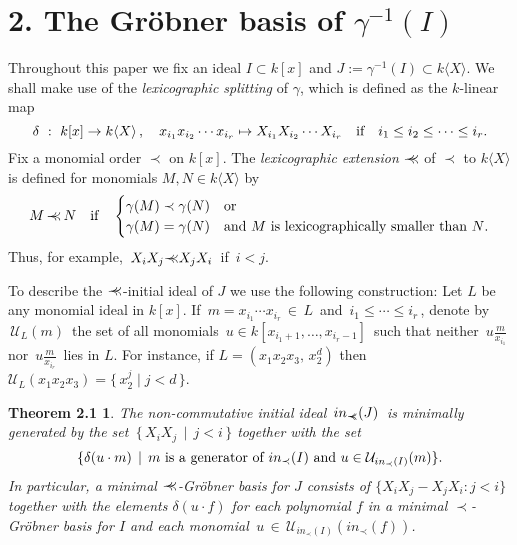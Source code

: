 \documentclass{proc-l}
\theoremstyle{plain}
\newtheorem*{theorem2}{Theorem 2.1}
\theoremstyle{definition}
\newcommand{\precc}{{\prec \kern -5pt\prec }}
\begin{document}
\section*{2. The Gr\"{o}bner basis of $\gamma ^{-1}(I)$}

Throughout this paper we fix an ideal 
$I\subset k[x] $ and  
$J := \gamma ^{-1}(I)\subset k \langle X \rangle $.
We shall make use of the {\em lexicographic splitting} of 
$\gamma $, which is defined as the $k$-linear map
\begin{equation*}\delta \,\,: \,\, k[x] \to k \langle X \rangle \, , \quad x_{i_{1}} x_{i_{2}} \cdots x_{i_{r}}  \mapsto X_{i_{1}} X_{i_{2}} \cdots X_{i_{r}}\ \ \
   \hbox {if}\ \ \ i_{1} \leq i_{2} \leq \cdots \leq i_{r}.  \end{equation*}
Fix a monomial order $\prec $ on $k[x]$.
The {\em lexicographic extension\/} $\precc $ of $\prec $
to $k \langle X \rangle $ is
defined for monomials
$M, N \in k \langle X \rangle $ by
\begin{equation*}M \,\precc \, N \ \ \ \hbox {if} \ \ \ \begin{cases}\gamma (M)\prec \gamma (N) &\text{or}\\
\gamma (M) = \gamma (N) &\text{and 
$M$ is lexicographically smaller than $N$.}
\end{cases}
\end{equation*}
Thus, for example, $\,X_{i}X_{j}\precc X_{j}X_{i} \,$ if $\, i<j$.

To describe the $\precc $-initial ideal of $J$ we use the
following construction:
Let $L$ be any monomial ideal in $k[x]$.
If $\, m = x_{i_{1}} \cdots x_{i_{r}} \,\in \, L \,$
and $\, i_{1} \leq \cdots \leq i_{r} \,$, denote by 
$\, {\mathcal{U}}_{L} (m)  \,$  the set of all monomials
$ \, u \in k[x_{i_{1}+1},\ldots , x_{i_{r}-1}]\,$ such that
neither $\, u\frac{m}{x_{i_{1}}}\,$ nor
$\, u\frac{m}{x_{i_{r}}}\,$ lies in $L$. 
For instance,
if $L = (x_{1} x_{2} x_{3},\, x_{2}^{d})$ then 
${\mathcal{U}}_{L} (x_{1} x_{2} x_{3}) = \{\,x_{2}^{j} \mid j < d  \,\}.$

\begin{theorem2}
The non-commutative initial ideal  $\,in_{\precc }(J) \,$
is minimally generated by the set
$\, \{\, X_{i} X_{j} \,\mid \, j<i \,\}$ 
together with the set
\begin{equation*}\{\delta ( u \cdot m) \,\mid \,
m \ \hbox{is a generator of} \
in_{\prec }(I) 
\
\hbox {and} 
\
u \in {\mathcal{U}}_{in_{\prec }(I)}(m)\}.
\end{equation*}
In particular, a 
minimal $\precc $-Gr\"{o}bner basis for $J$ consists of
$\{ X_{i} X_{j} - X_{j} X_{i} : j < i \} $ together
with the elements $\delta ( u \cdot f) $
for each polynomial $f$ in a minimal $\prec $-Gr\"{o}bner basis for $I$
and each monomial $\,u \, \in \,
{\mathcal{U}}_{in_{\prec }(I)}(in_{\prec }(f))$.
\end{theorem2}
\end{document}

